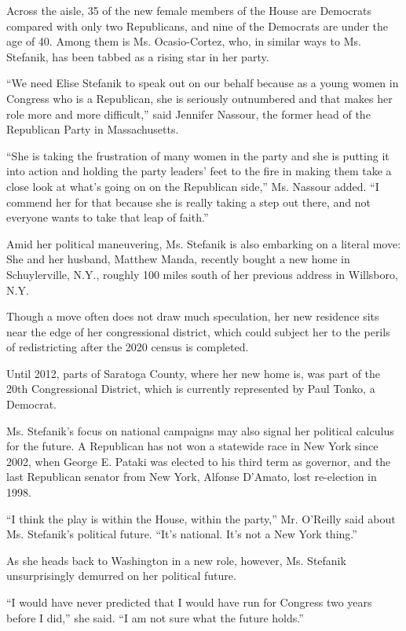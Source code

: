 Across the aisle, 35 of the new female members of the House are
Democrats compared with only two Republicans, and nine of the Democrats
are under the age of 40. Among them is Ms. Ocasio-Cortez, who, in
similar ways to Ms. Stefanik, has been tabbed as a rising star in her
party.

``We need Elise Stefanik to speak out on our behalf because as a young
women in Congress who is a Republican, she is seriously outnumbered and
that makes her role more and more difficult,'' said Jennifer Nassour,
the former head of the Republican Party in Massachusetts.

``She is taking the frustration of many women in the party and she is
putting it into action and holding the party leaders' feet to the fire
in making them take a close look at what's going on on the Republican
side,'' Ms. Nassour added. ``I commend her for that because she is
really taking a step out there, and not everyone wants to take that leap
of faith.''

Amid her political maneuvering, Ms. Stefanik is also embarking on a
literal move: She and her husband, Matthew Manda, recently bought a new
home in Schuylerville, N.Y., roughly 100 miles south of her previous
address in Willsboro, N.Y.

Though a move often does not draw much speculation, her new residence
sits near the edge of her congressional district, which could subject
her to the perils of redistricting after the 2020 census is completed.

Until 2012, parts of Saratoga County, where her new home is, was part of
the 20th Congressional District, which is currently represented by Paul
Tonko, a Democrat.

Ms. Stefanik's focus on national campaigns may also signal her political
calculus for the future. A Republican has not won a statewide race in
New York since 2002, when George E. Pataki was elected to his third term
as governor, and the last Republican senator from New York, Alfonse
D'Amato, lost re-election in 1998.

``I think the play is within the House, within the party,'' Mr. O'Reilly
said about Ms. Stefanik's political future. ``It's national. It's not a
New York thing.''

As she heads back to Washington in a new role, however, Ms. Stefanik
unsurprisingly demurred on her political future.

``I would have never predicted that I would have run for Congress two
years before I did,'' she said. ``I am not sure what the future holds.''

